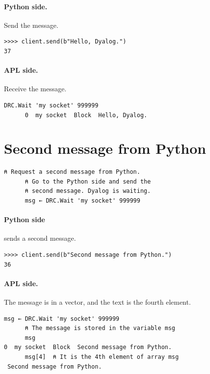 \documentclass[a4paper,12pt]{book}
\begin{document}
\paragraph{Python side.} Send the message.
\begin{verbatim}
>>>> client.send(b"Hello, Dyalog.")
37
\end{verbatim}

\paragraph{APL side.} Receive the message.
\begin{lstlisting}[language=apl]
      DRC.Wait 'my socket' 999999
      0  my socket  Block  Hello, Dyalog.
\end{lstlisting}

\newpage
\section{Second message from Python}
\begin{lstlisting}[language=apl]
      ⍝ Request a second message from Python.
      ⍝ Go to the Python side and send the       
      ⍝ second message. Dyalog is waiting.
      msg ← DRC.Wait 'my socket' 999999
\end{lstlisting}

\paragraph{Python side} sends a second message.
\begin{verbatim}
>>>> client.send(b"Second message from Python.")
36
\end{verbatim}

\paragraph{APL side.} The message is in a vector,
and the text is the fourth element.
\begin{lstlisting}[language=apl]
      msg ← DRC.Wait 'my socket' 999999
      ⍝ The message is stored in the variable msg
      msg
0  my socket  Block  Second message from Python.
      msg[4]  ⍝ It is the 4th element of array msg
 Second message from Python.
\end{lstlisting}
\end{document}
